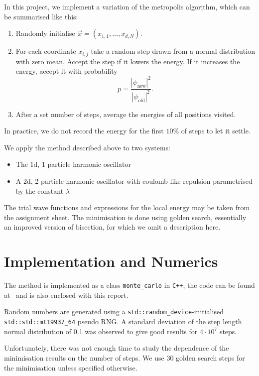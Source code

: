 \documentclass[a4paper,DIV=12,english]{scrartcl}
\begin{document}
In this project, we implement a variation of the metropolis algorithm, which can be summarised like this:
\begin{enumerate}
    \item Randomly initialise $\vec{x} = (x_{1,1}, \dots, x_{d,N})$.
    \item For each coordinate $x_{i,j}$ take a random step drawn from a normal distribution with zero mean. Accept the step if it lowers the energy. If it increases the energy, accept it with probability
    \begin{equation}
        p = \frac{|\psi_\text{new}|^2}{|\psi_\text{old}|^2}.
    \end{equation}
    \item After a set number of steps, average the energies of all positions visited.
\end{enumerate}
In practice, we do not record the energy for the first $10\%$ of steps to let it settle.

We apply the method described above to two systems:
\begin{itemize}
    \item The 1d, 1 particle harmonic oscillator
    \item A 2d, 2 particle harmonic oscillator with coulomb-like repulsion parametrised by the constant $\lambda$
\end{itemize}
The trial wave functions and expressions for the local energy may be taken from the assignment sheet. The minimisation is done using golden search, essentially an improved version of bisection, for which we omit a description here.

\section{Implementation and Numerics} 
The method is implemented as a class \texttt{monte\_carlo} in \texttt{C++}, the code can be found at~\cite{github} and is also enclosed with this report.

Random numbers are generated using a \texttt{std::random\_device}-initialised \texttt{std::std::mt19937\_64} pseudo RNG. A standard deviation of the step length normal distribution of 0.1 was observed to give good results for $4\cdot10^7$ steps.

Unfortunately, there was not enough time to study the dependence of the minimisation results on the number of steps. We use 30 golden search steps for the minimisation unless specified otherwise.
\end{document}
